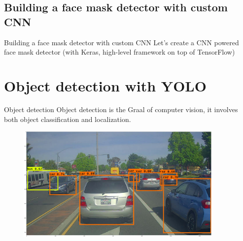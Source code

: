 \documentclass[tikz,table,border=2mm]{beamer}
\begin{document}
\subsection{Building a face mask detector with custom CNN}
\begin{frame}{Building a face mask detector with custom CNN}
Let's create a CNN powered face mask detector (with Keras, high-level framework on top of TensorFlow)

\end{frame}

\section{Object detection with YOLO}
\begin{frame}{Object detection}
Object detection is the Graal of computer vision, it involves both object classification and localization.
\begin{figure}[ht]
    \centering
    \includegraphics[width=0.9\textwidth]{images/obj_det_1.png}
\end{figure}
\end{frame}
\end{document}
